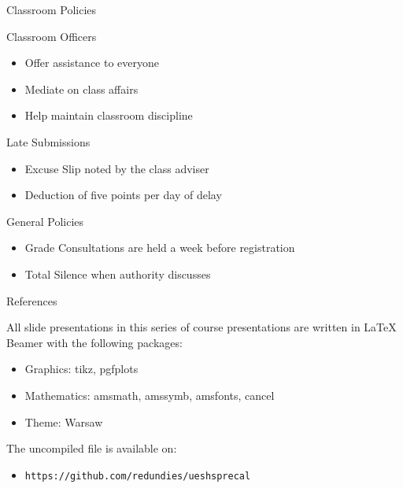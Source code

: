 \documentclass[12pt]{beamer}
\begin{document}
\begin{frame}{Classroom Policies}
 \begin{block}{Classroom Officers}
  \begin{itemize}
   \item Offer assistance to everyone
   \item Mediate on class affairs
   \item Help maintain classroom discipline
  \end{itemize}
 \end{block}

 \begin{block}{Late Submissions}
  \begin{itemize}
   \item Excuse Slip noted by the class adviser
   \item Deduction of five points per day of delay
  \end{itemize}
 \end{block}

 \begin{alertblock}{General Policies}
  \begin{itemize}
   \item Grade Consultations are held a week before registration
   \item Total Silence when authority discusses
  \end{itemize}
 \end{alertblock}
\end{frame}

\begin{frame}{References}

  All slide presentations in this series of course presentations are written in \LaTeX \, Beamer with the following packages: \\
  \begin{itemize}
   \item Graphics: tikz, pgfplots
   \item Mathematics: amsmath, amssymb, amsfonts, cancel
   \item Theme: Warsaw
  \end{itemize}

  The uncompiled file is available on: \\
  \begin{itemize}
   \item \texttt{https://github.com/redundies/ueshsprecal}
  \end{itemize}

\end{frame}
\end{document}
